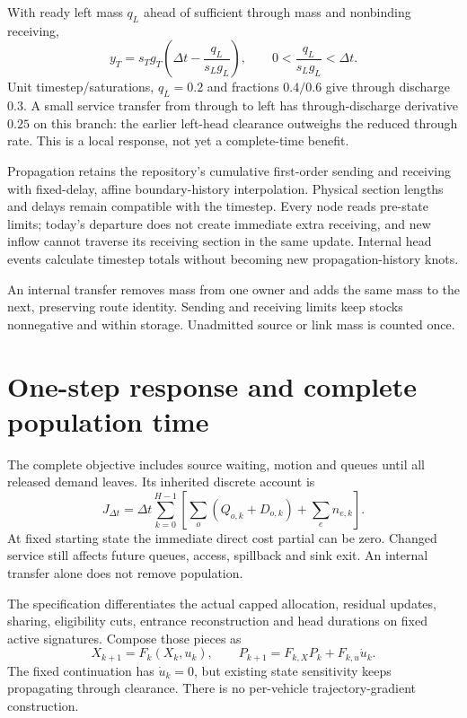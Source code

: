 \documentclass[11pt,a4paper]{article}
\begin{document}
With ready left mass $q_L$ ahead of sufficient through mass and
nonbinding receiving,
\begin{equation}
 y_T=s_Tg_T\left(\Delta t-\frac{q_L}{s_Lg_L}\right),
 \qquad 0<\frac{q_L}{s_Lg_L}<\Delta t.
 \label{eq:compact-service}
\end{equation}
Unit timestep/saturations, $q_L=0.2$ and fractions $0.4/0.6$ give
through discharge $0.3$. A small service transfer from through to left
has through-discharge derivative $0.25$ on this branch: the earlier
left-head clearance outweighs the reduced through rate. This is a
local response, not yet a complete-time benefit.

Propagation retains the repository's cumulative first-order sending and
receiving with fixed-delay, affine boundary-history interpolation.
Physical section lengths and delays remain compatible with the timestep.
Every node reads pre-state limits; today's departure does not create
immediate extra receiving, and new inflow cannot traverse its receiving
section in the same update. Internal head events calculate timestep
totals without becoming new propagation-history knots.

An internal transfer removes mass from one owner and adds the same mass
to the next, preserving route identity. Sending and receiving limits
keep stocks nonnegative and within storage. Unadmitted source or link
mass is counted once.

\section{One-step response and complete population time}

The complete objective includes source waiting, motion and queues until
all released demand leaves. Its inherited discrete account is
\begin{equation}
 J_{\Delta t}
 =\Delta t\sum_{k=0}^{H-1}
 \left[\sum_o(Q_{o,k}+D_{o,k})+\sum_en_{e,k}\right].
 \label{eq:compact-tst}
\end{equation}
At fixed starting state the immediate direct cost partial can be zero.
Changed service still affects future queues, access, spillback and sink
exit. An internal transfer alone does not remove population.

The specification differentiates the actual capped allocation, residual
updates, sharing, eligibility cuts, entrance reconstruction and head
durations on fixed active signatures. Compose those pieces as
\begin{equation}
 X_{k+1}=F_k(X_k,u_k),\qquad
 P_{k+1}=F_{k,X}P_k+F_{k,u}\dot u_k .
 \label{eq:compact-chain}
\end{equation}
The fixed continuation has $\dot u_k=0$, but existing state sensitivity
keeps propagating through clearance. There is no per-vehicle
trajectory-gradient construction.
\end{document}
